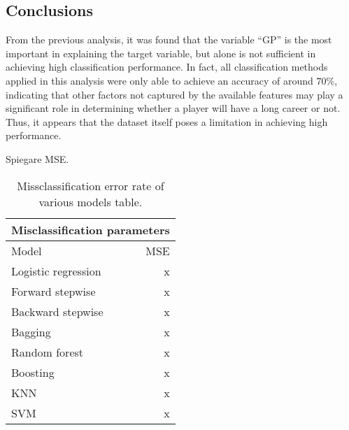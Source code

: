 \subsection{Conclusions}

From the previous analysis, it was found that the variable ``GP'' is the most important in explaining the target variable, but alone is not sufficient in achieving high classification performance. In fact, all classification methods applied in this analysis were only able to achieve an accuracy of around $70\%$, indicating that other factors not captured by the available features may play a significant role in determining whether a player will have a long career or not. Thus, it appears that the dataset itself poses a limitation in achieving high performance.

Spiegare MSE.

\begin{table}[H]
	\centering
	\begin{tabular}{|| l | r ||} 
		\hline
		\multicolumn{2}{|c|}{Misclassification parameters} \\
		\hline
		Model & MSE \\
		\hline
		Logistic regression & x \\
		\hline
		Forward stepwise & x \\
		\hline
		Backward stepwise & x \\
		\hline
		Bagging & x \\
		\hline
		Random forest & x \\
		\hline
		Boosting & x \\
		\hline
		KNN & x \\
		\hline
		SVM & x \\
		\hline
	\end{tabular}
	\caption{Missclassification error rate of various models table.}
	\label{table:ClasEvalParams}
\end{table}
